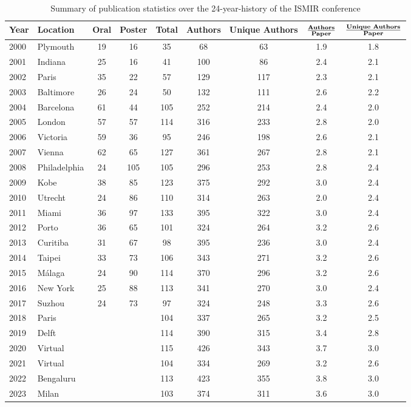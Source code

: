 \begin{table}[ht]
\caption{Summary of publication statistics over the 24-year-history of the ISMIR conference\label{tab:stats}}
\centering
\begin{tabular}{ l l c c c c c c c}
\toprule
\textbf{Year} & \textbf{Location} & \textbf{Oral} & \textbf{Poster} & \textbf{Total} & \textbf{Authors} & \textbf{Unique Authors} & $\frac{\textnormal{\textbf{Authors}}}{\textnormal{\textbf{Paper}}}$ & $\frac{\textnormal{\textbf{Unique Authors}}}{\textnormal{\textbf{Paper}}}$ \\
\midrule
2000 & Plymouth & 19 & 16 & 35 & 68 & 63 & 1.9 & 1.8 \\
2001 & Indiana & 25 & 16 & 41 & 100 & 86 & 2.4 & 2.1 \\
2002 & Paris & 35 & 22 & 57 & 129 & 117 & 2.3 & 2.1 \\
2003 & Baltimore & 26 & 24 & 50 & 132 & 111 & 2.6 & 2.2 \\
2004 & Barcelona & 61 & 44 & 105 & 252 & 214 & 2.4 & 2.0 \\
2005 & London & 57 & 57 & 114 & 316 & 233 & 2.8 & 2.0 \\
2006 & Victoria & 59 & 36 & 95 & 246 & 198 & 2.6 & 2.1 \\
2007 & Vienna & 62 & 65 & 127 & 361 & 267 & 2.8 & 2.1 \\
2008 & Philadelphia & 24 & 105 & 105 & 296 & 253 & 2.8 & 2.4 \\
2009 & Kobe & 38 & 85 & 123 & 375 & 292 & 3.0 & 2.4 \\
2010 & Utrecht & 24 & 86 & 110 & 314 & 263 & 2.0 & 2.4 \\
2011 & Miami & 36 & 97 & 133 & 395 & 322 & 3.0 & 2.4 \\
2012 & Porto & 36 & 65 & 101 & 324 & 264 & 3.2 & 2.6 \\
2013 & Curitiba & 31 & 67 & 98 & 395 & 236 & 3.0 & 2.4 \\
2014 & Taipei & 33 & 73 & 106 & 343 & 271 & 3.2 & 2.6 \\
2015 & Málaga & 24 & 90 & 114 & 370 & 296 & 3.2 & 2.6 \\
2016 & New York & 25 & 88 & 113 & 341 & 270 & 3.0 & 2.4 \\
2017 & Suzhou & 24 & 73 & 97 & 324 & 248 & 3.3 & 2.6 \\
2018 & Paris &   &   & 104 & 337 & 265 & 3.2 & 2.5 \\
2019 & Delft &   &   & 114 & 390 & 315 & 3.4 & 2.8 \\
2020 & Virtual &   &   & 115 & 426 & 343 & 3.7 & 3.0 \\
2021 & Virtual &   &   & 104 & 334 & 269 & 3.2 & 2.6 \\
2022 & Bengaluru & & & 113 & 423 & 355 & 3.8 & 3.0 \\
2023 & Milan & & & 103 & 374 & 311 & 3.6 & 3.0 \\
\bottomrule
\end{tabular}
\end{table}

